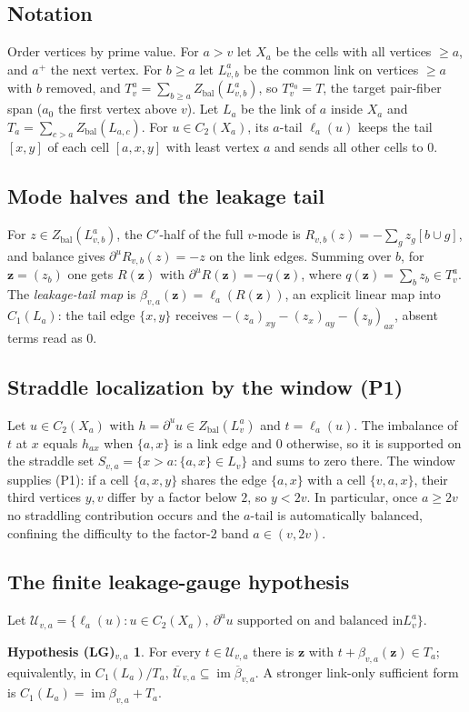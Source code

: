 \documentclass[11pt,reqno]{amsart}
\theoremstyle{plain}
\theoremstyle{definition}
\theoremstyle{plain}
\theoremstyle{definition}
\newtheorem*{hypLG}{Hypothesis (LG)$_{v,a}$}
\newcommand{\Zbal}{Z_{\mathrm{bal}}}
\newcommand{\dbu}{\partial^{u}}
\begin{document}
\subsection{Notation}
Order vertices by prime value. For $a>v$ let $X_a$ be the cells with all vertices $\ge a$, and
$a^+$ the next vertex. For $b\ge a$ let $L_{v,b}^a$ be the common link on vertices $\ge a$ with
$b$ removed, and $T_v^a=\sum_{b\ge a}\Zbal(L_{v,b}^a)$, so $T_v^{a_0}=T$, the target pair-fiber
span ($a_0$ the first vertex above $v$). Let $L_a$ be the link of $a$ inside $X_a$ and
$T_a=\sum_{c>a}\Zbal(L_{a,c})$. For $u\in C_2(X_a)$, its $a$-tail $\ell_a(u)$ keeps the tail
$[x,y]$ of each cell $[a,x,y]$ with least vertex $a$ and sends all other cells to $0$.

\subsection{Mode halves and the leakage tail}
For $z\in\Zbal(L_{v,b}^a)$, the $C'$-half of the full $v$-mode is
$R_{v,b}(z)=-\sum_g z_g[b\cup g]$, and balance gives $\dbu R_{v,b}(z)=-z$ on the link edges.
Summing over $b$, for $\mathbf z=(z_b)$ one gets $R(\mathbf z)$ with $\dbu R(\mathbf z)=-q(\mathbf
z)$, where $q(\mathbf z)=\sum_b z_b\in T_v^a$. The \emph{leakage-tail map} is
$\beta_{v,a}(\mathbf z)=\ell_a(R(\mathbf z))$, an explicit linear map into $C_1(L_a)$: the tail
edge $\{x,y\}$ receives $-(z_a)_{xy}-(z_x)_{ay}-(z_y)_{ax}$, absent terms read as $0$.

\subsection{Straddle localization by the window (P1)}
Let $u\in C_2(X_a)$ with $h=\dbu u\in\Zbal(L_v^a)$ and $t=\ell_a(u)$. The imbalance of $t$ at
$x$ equals $h_{ax}$ when $\{a,x\}$ is a link edge and $0$ otherwise, so it is supported on the
straddle set $S_{v,a}=\{x>a:\{a,x\}\in L_v\}$ and sums to zero there. The window supplies (P1):
if a cell $\{a,x,y\}$ shares the edge $\{a,x\}$ with a cell $\{v,a,x\}$, their third vertices
$y,v$ differ by a factor below $2$, so $y<2v$. In particular, once $a\ge2v$ no straddling
contribution occurs and the $a$-tail is automatically balanced, confining the difficulty to the
factor-$2$ band $a\in(v,2v)$.

\subsection{The finite leakage-gauge hypothesis}
Let $\mathcal U_{v,a}=\{\ell_a(u): u\in C_2(X_a),\ \dbu u\text{ supported on and balanced in
}L_v^a\}$.
\begin{hypLG}
For every $t\in\mathcal U_{v,a}$ there is $\mathbf z$ with $t+\beta_{v,a}(\mathbf z)\in T_a$;
equivalently, in $C_1(L_a)/T_a$, $\overline{\mathcal U}_{v,a}\subseteq\operatorname{im}
\overline{\beta}_{v,a}$. A stronger link-only sufficient form is
$C_1(L_a)=\operatorname{im}\beta_{v,a}+T_a$.
\end{hypLG}
\end{document}
